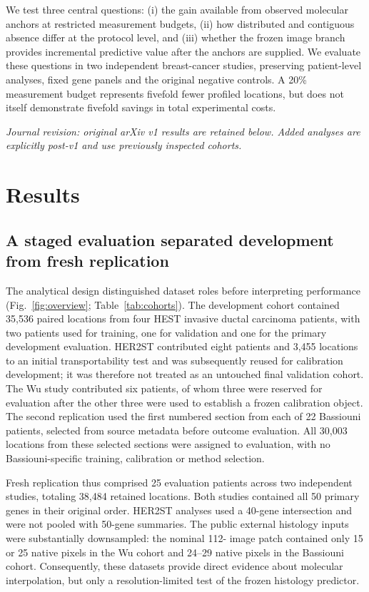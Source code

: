 We test three central questions: (i) the gain available from observed molecular anchors at restricted measurement budgets, (ii) how distributed and contiguous absence differ at the protocol level, and (iii) whether the frozen image branch provides incremental predictive value after the anchors are supplied. We evaluate these questions in two independent breast-cancer studies, preserving patient-level analyses, fixed gene panels and the original negative controls. A 20\% measurement budget represents fivefold fewer profiled locations, but does not itself demonstrate fivefold savings in total experimental costs.

\noindent\textit{Journal revision: original arXiv v1 results are retained below. Added analyses are explicitly post-v1 and use previously inspected cohorts.}

\section{Results}
\subsection{A staged evaluation separated development from fresh replication}
The analytical design distinguished dataset roles before interpreting performance (Fig.~\ref{fig:overview}; Table~\ref{tab:cohorts}). The development cohort contained 35,536 paired locations from four HEST invasive ductal carcinoma patients, with two patients used for training, one for validation and one for the primary development evaluation. HER2ST contributed eight patients and 3,455 locations to an initial transportability test and was subsequently reused for calibration development; it was therefore not treated as an untouched final validation cohort. The Wu study contributed six patients, of whom three were reserved for evaluation after the other three were used to establish a frozen calibration object. The second replication used the first numbered section from each of 22 Bassiouni patients, selected from source metadata before outcome evaluation. All 30,003 locations from these selected sections were assigned to evaluation, with no Bassiouni-specific training, calibration or method selection.

Fresh replication thus comprised 25 evaluation patients across two independent studies, totaling 38,484 retained locations. Both studies contained all 50 primary genes in their original order. HER2ST analyses used a 40-gene intersection and were not pooled with 50-gene summaries. The public external histology inputs were substantially downsampled: the nominal 112-\um{} image patch contained only 15 or 25 native pixels in the Wu cohort and 24--29 native pixels in the Bassiouni cohort. Consequently, these datasets provide direct evidence about molecular interpolation, but only a resolution-limited test of the frozen histology predictor.

